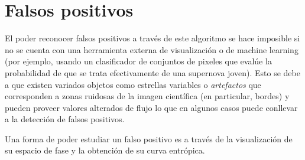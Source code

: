 \section{Falsos positivos}
El poder reconocer falsos positivos a trav\'es de este algoritmo se hace imposible si no se cuenta con una herramienta externa de visualizaci\'on o de machine learning (por ejemplo, usando un clasificador de conjuntos de pixeles que eval\'ue la probabilidad de que se trata efectivamente de una supernova joven). Esto se debe a que existen variados objetos como estrellas variables o \textit{artefactos} que corresponden a zonas ruidosas de la imagen  cient\'ifica (en particular, bordes) y pueden proveer valores alterados de flujo lo que en algunos casos puede conllevar a la detecci\'on de falsos positivos.
\bigskip

Una forma de poder estudiar un falso positivo es a trav\'es de la visualizaci\'on de su espacio de fase y la obtenci\'on de su curva entr\'opica.